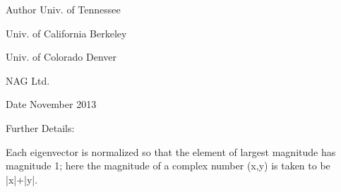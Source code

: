 \begin{DoxyAuthor}{Author}
Univ. of Tennessee 

Univ. of California Berkeley 

Univ. of Colorado Denver 

N\+A\+G Ltd. 
\end{DoxyAuthor}
\begin{DoxyDate}{Date}
November 2013 
\end{DoxyDate}
\begin{DoxyParagraph}{Further Details\+: }
\begin{DoxyVerb}  Each eigenvector is normalized so that the element of largest
  magnitude has magnitude 1; here the magnitude of a complex number
  (x,y) is taken to be |x|+|y|.\end{DoxyVerb}
 
\end{DoxyParagraph}
